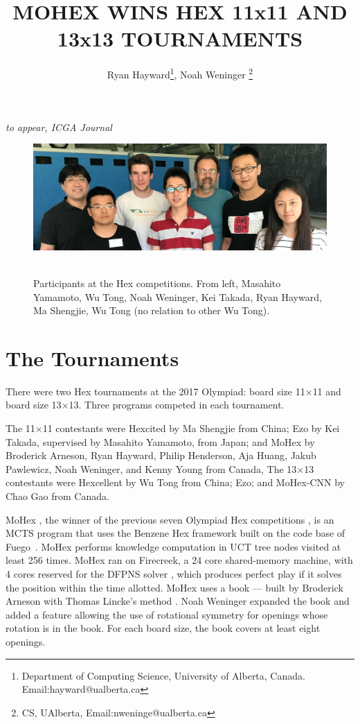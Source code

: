 \documentclass{icga}
\title{\sc MOHEX WINS HEX 11x11 AND 13x13 TOURNAMENTS}
\author{Ryan Hayward\thanks{Department of Computing Science, 
University of Alberta, Canada. Email:hayward@ualberta.ca},
Noah Weninger \thanks{CS, UAlberta, Email:nweninge@ualberta.ca}
}
\affiliation{Edmonton, Canada}
\newif\iflong\longfalse  %
\def\Eo{\mbox{\sc Ezo}}
\def\Hite{\mbox{\sc Hexcited}}
\def\Hent{\mbox{\sc Hexcellent}}
\def\Mx{\mbox{\sc MoHex}}
\def\Mc{\mbox{\sc MoHex-CNN}}
\def\Fuego{\mbox{\sc Fuego}}
\begin{document}
\maketitle


\vspace*{-2.25in}
{\it to appear, ICGA Journal}
\vspace*{2.0in}

\begin{figure}[hbt]
\includegraphics[width=\columnwidth]{photos/people-1.eps}\
\caption{Participants at the Hex competitions. From left,
Masahito Yamamoto, 
Wu Tong,
Noah Weninger, 
Kei Takada, 
Ryan Hayward, 
Ma Shengjie, 
Wu Tong (no relation to other Wu Tong).} \end{figure}

\section{The Tournaments}
There were two Hex tournaments at the 2017 Olympiad:
board size 11$\times$11 and board size 13$\times$13.
Three programs competed in each tournament.

The 11$\times$11 contestants were
\Hite{} by Ma Shengjie from China;
\Eo{} by Kei Takada, supervised by Masahito Yamamoto, from Japan;
and \Mx{}
by Broderick Arneson, Ryan Hayward, Philip Henderson, Aja Huang, 
Jakub Pawlewicz, Noah Weninger, and Kenny Young from Canada,
The 13$\times$13 contestants were
\Hent{} by Wu Tong from China;
\Eo{}; and
\Mc{} by Chao Gao from Canada.

\Mx{} ,
the winner of the previous seven Olympiad Hex competitions ,
is an MCTS program that uses the Benzene Hex framework
built on the code base of \Fuego\ .
\Mx{} performs knowledge computation 
in UCT tree nodes visited at least 256 times.
\Mx{} ran on Firecreek, a 24 core shared-memory machine, 
with 4 cores reserved for the 
DFPNS solver , which
produces perfect play if it solves the
position within the time allotted.
\Mx{} uses a book ---
built by Broderick Arneson with Thomas Lincke's method 
. 
Noah Weninger expanded the book and added a feature
allowing the use of rotational symmetry for openings
whose rotation is in the book.
For each board size, the book covers at least eight openings.
\end{document}
